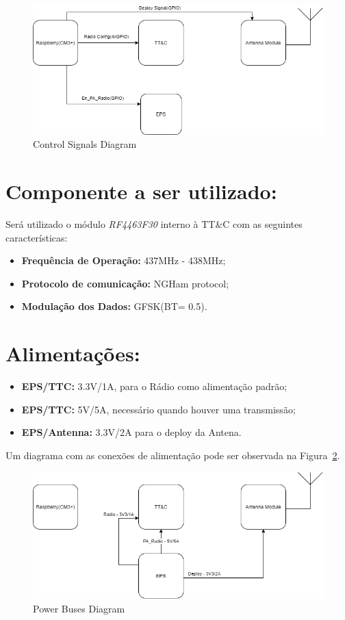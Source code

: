 \documentclass{article}
\begin{document}
\begin{figure}[htbp]
    \centering
    \includegraphics[scale=.5]{Control_signals.png}
    \caption{Control Signals Diagram}
    \label{signals}
\end{figure}

\section{Componente a ser utilizado:}

Será utilizado o módulo \textit{RF4463F30} interno à TT\&C com as seguintes características:

\begin{itemize}
    \item \textbf{Frequência de Operação:} 437MHz - 438MHz;
    \item \textbf{Protocolo de comunicação:} NGHam protocol;
    \item \textbf{Modulação dos Dados:} GFSK(BT= 0.5).

\end{itemize}

\section{Alimentações:}

\begin{itemize}
    \item \textbf{EPS/TTC:} 3.3V/1A, para o Rádio como alimentação padrão;
    \item \textbf{EPS/TTC:} 5V/5A, necessário quando houver uma transmissão;
    \item \textbf{EPS/Antenna:} 3.3V/2A para o deploy da Antena.
\end{itemize}

Um diagrama com as conexões de alimentação pode ser observada na Figura~\ref{power}.

\begin{figure}[htbp]
    \centering
    \includegraphics[scale=.5]{Power_buses.png}
    \caption{Power Buses Diagram}
    \label{power}
\end{figure}
\end{document}
